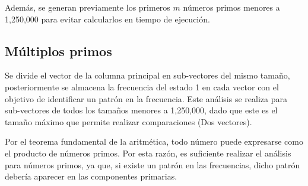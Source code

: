 \documentclass[12pt,twoside]{article}
\begin{document}
	Además, se generan previamente los primeros $m$ números primos menores a 1,250,000 para evitar calcularlos en tiempo de ejecución.
	
	\subsection{Múltiplos primos}
	
	Se divide el vector de la columna principal en sub-vectores del mismo tamaño, posteriormente se almacena la frecuencia del estado 1 en cada vector con el objetivo de identificar un patrón en la frecuencia. Este análisis se realiza para sub-vectores de todos los tamaños menores a 1,250,000, dado que este es el tamaño máximo que permite realizar comparaciones (Dos vectores).
	
	Por el teorema fundamental de la aritmética, todo número puede expresarse como el producto de números primos. Por esta razón, es suficiente realizar el análisis para números primos, ya que, si existe un patrón en las frecuencias, dicho patrón debería aparecer en las componentes primarias.
	
\end{document}
